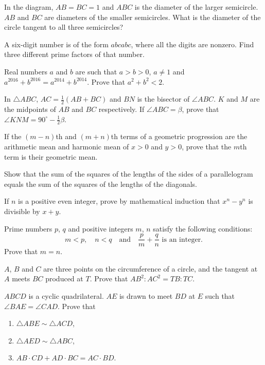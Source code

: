 \begin{problems}
    \problem In the diagram, $AB = BC = 1$ and $ABC$ is the diameter of the larger semicircle. $AB$ and $BC$ are diameters of the smaller semicircles. What is the diameter of the circle tangent to all three semicircles? 

    \problem A six-digit number is of the form $abcabc$, where all the digits are nonzero. Find three different prime factors of that number. 

    \problem Real numbers $a$ and $b$ are such that $a > b > 0$, $a \ne 1$ and $a^{2016} + b^{2016} = a^{2014} + b^{2014}$. Prove that $a^2 + b^2 < 2$. 

    \problem In $\triangle ABC$, $AC = \frac{1}{2}(AB + BC)$ and $BN$ is the bisector of $\angle ABC$. $K$ and $M$ are the midpoints of $AB$ and $BC$ respectively. If $\angle ABC = \beta$, prove that $\angle KNM = 90^\circ - \frac{1}{2}\beta$. 

    \problem If the $(m - n)$th and $(m + n)$th terms of a geometric progression are the arithmetic mean and harmonic mean of $x > 0$ and $y > 0$, prove that the $m$th term is their geometric mean. 

    \problem Show that the sum of the squares of the lengths of the sides of a parallelogram equals the sum of the squares of the lengths of the diagonals. 

    \problem If $n$ is a positive even integer, prove by mathematical induction that $x^n - y^n$ is divisible by $x + y$. 

    \problem Prime numbers $p$, $q$ and positive integers $m$, $n$ satisfy the following conditions:
    \[m < p,\quad n < q \quad \text{and} \quad\frac{p}{m}+\frac{q}{n} \text{  is an integer.}\]
    Prove that $m = n$. 

    \problem $A$, $B$ and $C$ are three points on the circumference of a circle, and the tangent at $A$ meets $BC$ produced at $T$. Prove that $AB^2 : AC^2 = TB : TC$. 
    
    \problem $ABCD$ is a cyclic quadrilateral. $AE$ is drawn to meet $BD$ at $E$ such that $\angle BAE = \angle CAD$. Prove that 
    \begin{enumerate}
        \item $\triangle ABE \sim \triangle ACD$, 
        
        \item $\triangle AED \sim \triangle ABC$,
        
        \item $AB \cdot CD + AD \cdot BC = AC \cdot BD$.
    \end{enumerate}
\end{problems}
